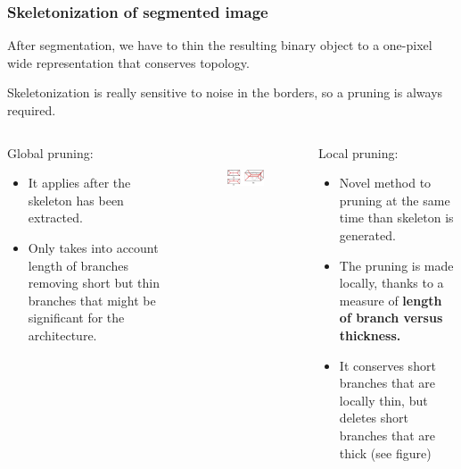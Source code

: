 \documentclass[9pt]{beamer}
\begin{document}
\begin{frame}[t]
  \frametitle{Skeletonization of segmented image}
     After segmentation, we have to thin the resulting binary object to a one-pixel wide representation that conserves topology.
     
     Skeletonization is really sensitive to noise in the borders, so a pruning is always required.
     \begin{columns}[T,onlytextwidth]
       \begin{exampleblock}{Global pruning:}
         \begin{itemize}
           \item It applies after the skeleton has been extracted.
           \item Only takes into account length of branches removing short but thin branches that might be significant for the architecture.
         \end{itemize}
       \end{exampleblock}
       \begin{figure}[h]
       \includegraphics[height=2cm]{./Figures/skeleton/rectangle3D.jpg}
       \end{figure}
       \begin{exampleblock}{Local pruning:}
         \begin{itemize}
           \item Novel method to pruning at the same time than skeleton is generated.
           \item The pruning is made locally, thanks to a measure of \textbf{length of branch versus thickness.}
           \item It conserves short branches that are locally thin, but deletes short branches that are thick (see figure)
         \end{itemize}
       \end{exampleblock}
     \end{columns}
\end{frame}
\end{document}
